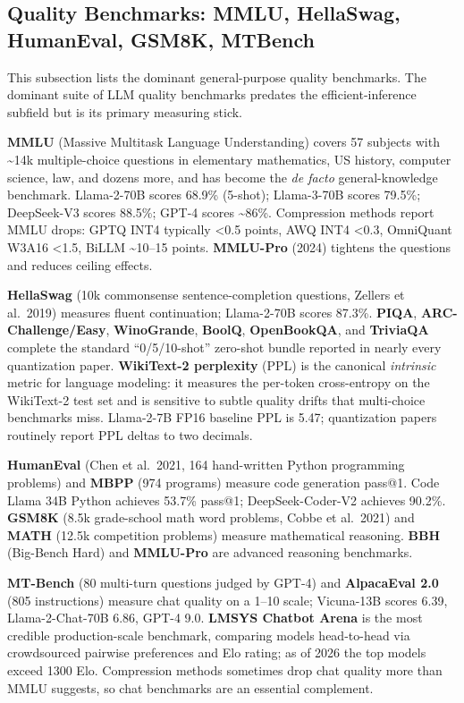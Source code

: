 \documentclass{article}
\begin{document}
\subsection{Quality Benchmarks: MMLU, HellaSwag, HumanEval, GSM8K, MTBench}\label{quality-benchmarks-mmlu-hellaswag-humaneval-gsm8k-mtbench}

This subsection lists the dominant general-purpose quality benchmarks. The dominant suite of LLM quality benchmarks predates the efficient-inference subfield but is its primary measuring stick.

\textbf{MMLU} (Massive Multitask Language Understanding) covers 57 subjects with \textasciitilde14k multiple-choice questions in elementary mathematics, US history, computer science, law, and dozens more, and has become the \emph{de facto} general-knowledge benchmark. Llama-2-70B scores 68.9\% (5-shot); Llama-3-70B scores 79.5\%; DeepSeek-V3 scores 88.5\%; GPT-4 scores \textasciitilde86\%. Compression methods report MMLU drops: GPTQ INT4 typically \textless0.5 points, AWQ INT4 \textless0.3, OmniQuant W3A16 \textless1.5, BiLLM \textasciitilde10--15 points. \textbf{MMLU-Pro} (2024) tightens the questions and reduces ceiling effects.

\textbf{HellaSwag} (10k commonsense sentence-completion questions, Zellers et al.~2019) measures fluent continuation; Llama-2-70B scores 87.3\%. \textbf{PIQA}, \textbf{ARC-Challenge/Easy}, \textbf{WinoGrande}, \textbf{BoolQ}, \textbf{OpenBookQA}, and \textbf{TriviaQA} complete the standard ``0/5/10-shot'' zero-shot bundle reported in nearly every quantization paper. \textbf{WikiText-2 perplexity} (PPL) is the canonical \emph{intrinsic} metric for language modeling: it measures the per-token cross-entropy on the WikiText-2 test set and is sensitive to subtle quality drifts that multi-choice benchmarks miss. Llama-2-7B FP16 baseline PPL is 5.47; quantization papers routinely report PPL deltas to two decimals.

\textbf{HumanEval} (Chen et al.~2021, 164 hand-written Python programming problems) and \textbf{MBPP} (974 programs) measure code generation pass@1. Code Llama 34B Python achieves 53.7\% pass@1; DeepSeek-Coder-V2 achieves 90.2\%. \textbf{GSM8K} (8.5k grade-school math word problems, Cobbe et al.~2021) and \textbf{MATH} (12.5k competition problems) measure mathematical reasoning. \textbf{BBH} (Big-Bench Hard) and \textbf{MMLU-Pro} are advanced reasoning benchmarks.

\textbf{MT-Bench} (80 multi-turn questions judged by GPT-4) and \textbf{AlpacaEval 2.0} (805 instructions) measure chat quality on a 1--10 scale; Vicuna-13B scores 6.39, Llama-2-Chat-70B 6.86, GPT-4 9.0. \textbf{LMSYS Chatbot Arena} is the most credible production-scale benchmark, comparing models head-to-head via crowdsourced pairwise preferences and Elo rating; as of 2026 the top models exceed 1300 Elo. Compression methods sometimes drop chat quality more than MMLU suggests, so chat benchmarks are an essential complement.
\end{document}
